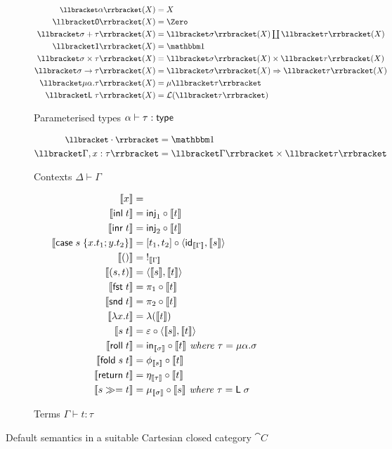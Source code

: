 \begin{figure}
\begin{subfigure}{\linewidth}
  \begin{align*}
  \small
  \sem{\alpha}(X) &= X
  \\
  \sem{\tyZero}(X) &= \Zero
  \\
  \sem{\sigma \tySum \tau}(X) &= \textstyle {\sem{\sigma}(X)} \coprod {\sem{\tau}(X)}
  \\
  \sem{\tyUnit}(X) &= \One
  \\
  \sem{\sigma \tyProd \tau}(X) &= \sem{\sigma}(X) \times \sem{\tau}(X)
  \\
  \sem{\sigma \tyFun \tau}(X) &= \internalHom{\sem{\sigma}(X)}{\sem{\tau}(X)}
  \\
  \sem{\mu\alpha.\tau}(X) &= \mu\sem{\tau}
  \\
  \sem{\tyLift\;\tau}(X) &= \mathcal{L}(\sem{\tau})
  \end{align*}
  \caption{Parameterised types $\alpha \vdash \tau: \mathsf{type}$}
  \label{fig:default-semantics:types}
\end{subfigure}
\begin{subfigure}{\linewidth}
  \begin{align*}
  \small
  \sem{\emptyCxt} &= \One
  \\
  \sem{\Gamma, x: \tau} &= \sem{\Gamma} \times \sem{\tau}
  \end{align*}
  \caption{Contexts $\Delta \vdash \Gamma$}
\end{subfigure}
\begin{subfigure}{\linewidth}
  \begin{align*}
  \small
  \llbracket x \rrbracket &=
  \\
  \llbracket \mathsf{inl}\;t \rrbracket &= \mathsf{inj}_1 \circ \llbracket t \rrbracket
  \\
  \llbracket \mathsf{inr}\;t \rrbracket &= \mathsf{inj}_2 \circ \llbracket t \rrbracket
  \\
  \llbracket \mathsf{case}\;s\;\{x.t_1; y.t_2\} \rrbracket &= [t_1, t_2] \circ \langle \mathsf{id}_{\llbracket \Gamma \rrbracket}, \llbracket s \rrbracket\rangle
  \\
  \llbracket () \rrbracket &=\;!_{\llbracket \Gamma \rrbracket}
  \\
  \llbracket (s,t) \rrbracket &= \langle \llbracket s \rrbracket, \llbracket t \rrbracket\rangle
  \\
  \llbracket \mathsf{fst}\;t \rrbracket &= \pi_1 \circ \llbracket t \rrbracket
  \\
  \llbracket \mathsf{snd}\;t \rrbracket &= \pi_2 \circ \llbracket t \rrbracket
  \\
  \llbracket \lambda x.t \rrbracket &= \lambda(\llbracket t \rrbracket)
  \\
  \llbracket s\;t \rrbracket &= \varepsilon \circ \langle \llbracket s \rrbracket, \llbracket t \rrbracket\rangle
  \\
  \llbracket \mathsf{roll}\;t \rrbracket &= \mathsf{in}_{\llbracket \sigma \rrbracket} \circ \llbracket t \rrbracket
  \textit{ where }\tau = \mu\alpha.\sigma
  \\
  \llbracket \mathsf{fold}\;s\;t \rrbracket &= \phi_{\llbracket s \rrbracket} \circ \llbracket t \rrbracket
  \\
  \llbracket \mathsf{return}\;t \rrbracket &= \eta_{\llbracket \tau \rrbracket} \circ \llbracket t \rrbracket
  \\
  \llbracket {s}\gg={t} \rrbracket &= \mu_{\llbracket \sigma \rrbracket} \circ \llbracket s \rrbracket
  \textit{ where }\tau = \mathsf{L}\;\sigma
  \end{align*}
  \caption{Terms $\Gamma \vdash t: \tau$}
\end{subfigure}
\caption{Default semantics in a suitable Cartesian closed category $\cat{C}$}
\end{figure}
